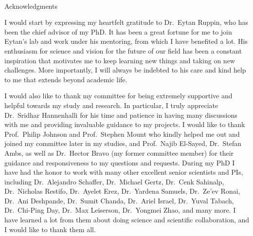 \documentclass[12pt,twoside,openany,\mydriver]{thesis}  %
\renewcommand{\baselinestretch}{2}
\begin{document}
  \begin{acknowledgements}
    \renewcommand{\baselinestretch}{2} \small\normalsize \hbox{\ }
    \vspace{.5in}
    \begin{center} \large{Acknowledgments} \end{center}
    \vspace{1ex}
    
    I would start by expressing my heartfelt gratitude to Dr.~Eytan Ruppin, who has been the chief advisor of my PhD. It has been a great fortune for me to join Eytan's lab and work under his mentoring, from which I have benefited a lot. His enthusiasm for science and vision for the future of our field has been a constant inspiration that motivates me to keep learning new things and taking on new challenges. More importantly, I will always be indebted to his care and kind help to me that extends beyond academic life.
    
    \par
    
    I would also like to thank my committee for being extremely supportive and helpful towards my study and research. In particular, I truly appreciate Dr.~Sridhar Hannenhalli for his time and patience in having many discussions with me and providing invaluable guidance to my projects. I would like to thank Prof.~Philip Johnson and Prof.~Stephen Mount who kindly helped me out and joined my committee later in my studies, and Prof.~Najib El-Sayed, Dr.~Stefan Ambs, as well as Dr.~Hector Bravo (my former committee member) for their guidance and responsiveness to my questions and requests. During my PhD I have had the honor to work with many other excellent senior scientists and PIs, including Dr.~Alejandro Schaffer, Dr.~Michael Gertz, Dr.~Cenk Sahinalp, Dr.~Nicholas Restifo, Dr.~Ayelet Erez, Dr.~Yardena Samuels, Dr.~Ze'ev Ronai, Dr.~Ani Deshpande, Dr.~Sumit Chanda, Dr.~Ariel Israel, Dr.~Yuval Tabach, Dr.~Chi-Ping Day, Dr.~Max Leiserson, Dr.~Yongmei Zhao, and many more. I have learned a lot from them about doing science and scientific collaboration, and I would like to thank them all.
    
    \par
    

\end{acknowledgements}
\end{document}
